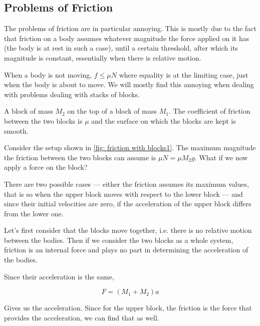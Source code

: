 \subsection{Problems of Friction}

The problems of friction are in particular annoying. This is mostly due to 
the fact that friction on a body assumes whatever magnitude the force applied
on it has (the body is at rest in such a case), until a certain threshold, after which its magnitude is constant, essentially 
when there is relative motion.

When a body is not moving, \(f \le \mu N\) where equality is at the limiting case, 
just when the body is about to move. We will mostly find this annoying when dealing with 
problems dealing with stacks of blocks.

\begin{marginfigure}
    \caption{A block of mass \(M_2\) on the top of a block of mass \(M_1\).
    The coefficient of friction between the two blocks is \(\mu\) and the surface on which
    the blocks are kept is smooth.}
    \label{fig: friction with blocks1}
\end{marginfigure}

Consider the setup shown in \cref{fig: friction with blocks1}. The maximum magnitude the 
friction between the two blocks can assume is \(\mu N = \mu M_2g\). What if we now apply 
a force on the block? 

There are two possible cases --- either the friction assumes its maximum values, that is so when
the upper block moves with respect to the lower block --- and since their initial velocities
are zero, if the acceleration of the upper block differs from the lower one.

Let's first consider that the blocks move together, i.e. there is no relative motion 
between the bodies. Then if we consider the two blocks as a whole system,
friction is an internal force and plays no part in determining the acceleration of the bodies.

\begin{marginfigure}
\end{marginfigure}

Since their acceleration is the same, 

\begin{equation*}
    F = (M_1 + M_2)a
\end{equation*}

Gives us the acceleration. Since for the upper block, the friction is the force 
that provides the acceleration, we can find that as well.

